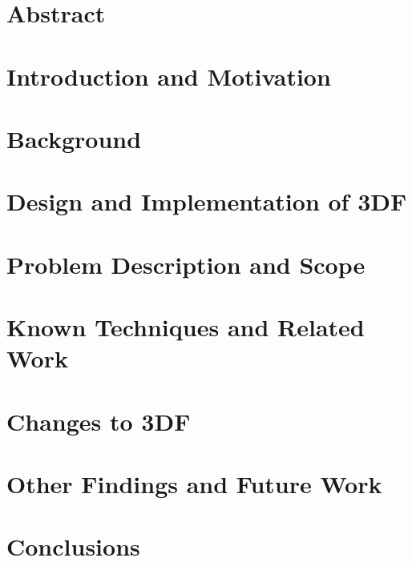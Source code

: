 \documentclass{article}
\begin{document}
\tableofcontents

\newpage

\section{Abstract} \label{abstract}

\section{Introduction and Motivation} \label{intro}


\section{Background} \label{background}


\section{Design and Implementation of 3DF} \label{3df}


\section{Problem Description and Scope} \label{problem}


\section{Known Techniques and Related Work} \label{known-techniques}




\section{Changes to 3DF} \label{implementation}


\section{Other Findings and Future Work} \label{future-work}


\section{Conclusions} \label{conclusions}

\newpage



\end{document}
